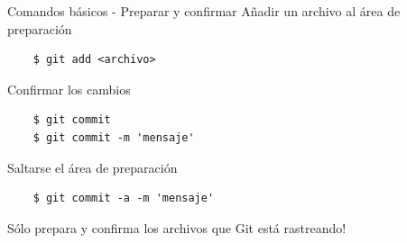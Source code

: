 \begin{frame}[fragile]{Comandos básicos - Preparar y confirmar}
  \alert{Añadir un archivo al área de preparación}
  \begin{verbatim}
    $ git add <archivo>
  \end{verbatim}

  \alert{Confirmar los cambios}
  \begin{verbatim}
    $ git commit
    $ git commit -m 'mensaje'
  \end{verbatim}

  \alert{Saltarse el área de preparación}
  \begin{verbatim}
    $ git commit -a -m 'mensaje'
  \end{verbatim}
  \hspace{1cm} {\scriptsize Sólo prepara y confirma los archivos que Git está rastreando!}

\end{frame}

